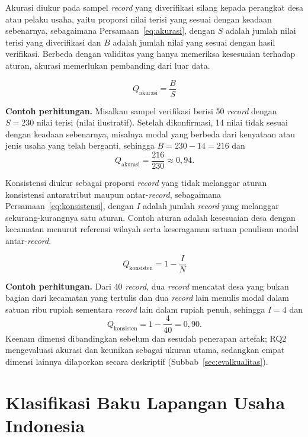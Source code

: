 Akurasi diukur pada sampel \textit{record} yang diverifikasi silang kepada perangkat desa atau pelaku usaha, yaitu proporsi nilai terisi yang sesuai dengan keadaan sebenarnya, sebagaimana Persamaan~\eqref{eq:akurasi}, dengan $S$ adalah jumlah nilai terisi yang diverifikasi dan $B$ adalah jumlah nilai yang sesuai dengan hasil verifikasi. Berbeda dengan validitas yang hanya memeriksa kesesuaian terhadap aturan, akurasi memerlukan pembanding dari luar data.

\begin{equation}
  Q_{\text{akurasi}} = \frac{B}{S}
  \label{eq:akurasi}
\end{equation}

\noindent\textbf{Contoh perhitungan.} Misalkan sampel verifikasi berisi 50 \textit{record} dengan $S = 230$ nilai terisi (nilai ilustratif). Setelah dikonfirmasi, 14 nilai tidak sesuai dengan keadaan sebenarnya, misalnya modal yang berbeda dari kenyataan atau jenis usaha yang telah berganti, sehingga $B = 230 - 14 = 216$ dan
\[
  Q_{\text{akurasi}} = \frac{216}{230} \approx 0{,}94.
\]

Konsistensi diukur sebagai proporsi \textit{record} yang tidak melanggar aturan konsistensi antaratribut maupun antar-\textit{record}, sebagaimana Persamaan~\eqref{eq:konsistensi}, dengan $I$ adalah jumlah \textit{record} yang melanggar sekurang-kurangnya satu aturan. Contoh aturan adalah kesesuaian desa dengan kecamatan menurut referensi wilayah serta keseragaman satuan penulisan modal antar-\textit{record}.

\begin{equation}
  Q_{\text{konsisten}} = 1 - \frac{I}{N}
  \label{eq:konsistensi}
\end{equation}

\noindent\textbf{Contoh perhitungan.} Dari 40 \textit{record}, dua \textit{record} mencatat desa yang bukan bagian dari kecamatan yang tertulis dan dua \textit{record} lain menulis modal dalam satuan ribu rupiah sementara \textit{record} lain dalam rupiah penuh, sehingga $I = 4$ dan
\[
  Q_{\text{konsisten}} = 1 - \frac{4}{40} = 0{,}90.
\]
Keenam dimensi dibandingkan sebelum dan sesudah penerapan artefak; RQ2 mengevaluasi akurasi dan keunikan sebagai ukuran utama, sedangkan empat dimensi lainnya dilaporkan secara deskriptif (Subbab~\ref{sec:evalkualitas}).

\section{Klasifikasi Baku Lapangan Usaha Indonesia}
\label{sec:kbli}

